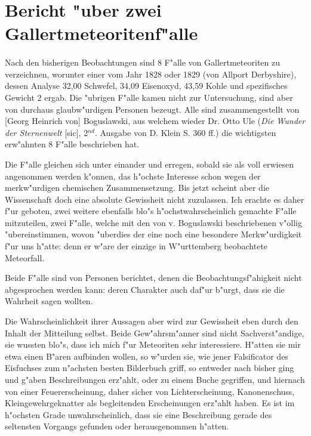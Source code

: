 \documentclass[a4paper, 11pt, oneside, german]{article}
\begin{document}
\section{Bericht "uber zwei Gallertmeteoritenf"alle}
\paragraph{}
Nach den bisherigen Beobachtungen sind 8 F"alle von Gallertmeteoriten zu verzeichnen, worunter einer vom Jahr 1828 oder 1829 (von Allport Derbyshire), dessen Analyse 32,00 Schwefel, 34,09 Eisenoxyd, 43,59 Kohle und spezifisches Gewicht 2 ergab. Die "ubrigen F"alle kamen nicht zur Untersuchung, sind aber von durchaus glaubw"urdigen Personen bezeugt. Alle sind zusammengestellt von [Georg Heinrich von] Boguslawski, aus welchem wieder Dr. Otto Ule (\emph{Die Wunder der Sternenwelt} [sic], 2$^{nd}$. Ausgabe von D. Klein S. 360 ff.) die wichtigsten erw"ahnten 8 F"alle beschrieben hat.

Die F"alle gleichen sich unter einander und erregen, sobald sie als voll erwiesen angenommen werden k"onnen, das h"ochste Interesse schon wegen der merkw"urdigen chemischen Zusammensetzung. Bis jetzt scheint aber die Wissenschaft doch eine absolute Gewissheit nicht zuzulassen. Ich erachte es daher f"ur geboten, zwei weitere ebenfalls blo"s h"ochstwahrscheinlich gemachte F"alle mitzuteilen, zwei F"alle, welche mit den von v. Boguslawski beschriebenen v"ollig "ubereinstimmen, wovon "uberdies der eine noch eine besondere Merkw"urdigkeit f"ur uns h"atte: denn er w"are der einzige in W"urttemberg beobachtete Meteorfall.

Beide F"alle sind von Personen berichtet, denen die Beobachtungsf"ahigkeit nicht abgesprochen werden kann: deren Charakter auch daf"ur b"urgt, dass sie die Wahrheit sagen wollten.

Die Wahrscheinlichkeit ihrer Aussagen aber wird zur Gewissheit eben durch den Inhalt der Mitteilung selbst. Beide Gew"ahrsm"anner sind nicht Sachverst"andige, sie wussten blo"s, dass ich mich f"ur Meteoriten sehr interessiere. H"atten sie mir etwa einen B"aren aufbinden wollen, so w"urden sie, wie jener Falsificator des Eisfuchses zum n"achsten besten Bilderbuch griff, so entweder nach bisher ging und g"aben Beschreibungen erz"ahlt, oder zu einem Buche gegriffen, und hiernach von einer Feuererscheinung, daher sicher von Lichterscheinung, Kanonenschuss, Kleingewehrgeknatter als begleitenden Erscheinungen erz"ahlt haben. Es ist im h"ochsten Grade unwahrscheinlich, dass sie eine Beschreibung gerade des seltensten Vorgangs gefunden oder herausgenommen h"atten.
\end{document}
